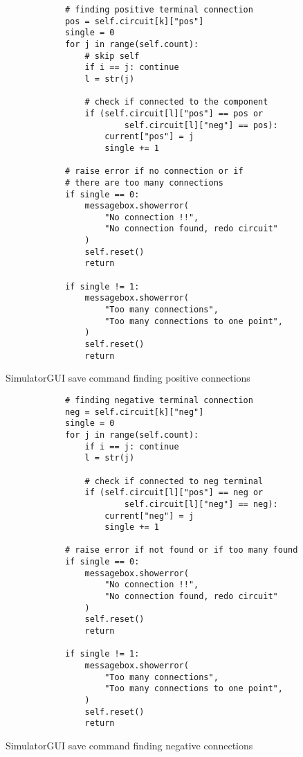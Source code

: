 \newpage
\begin{listing}[!ht]
    \begin{verbatim}
            # finding positive terminal connection
            pos = self.circuit[k]["pos"]
            single = 0
            for j in range(self.count):
                # skip self
                if i == j: continue
                l = str(j)
                
                # check if connected to the component
                if (self.circuit[l]["pos"] == pos or 
                        self.circuit[l]["neg"] == pos):
                    current["pos"] = j
                    single += 1
                
            # raise error if no connection or if 
            # there are too many connections
            if single == 0:
                messagebox.showerror(
                    "No connection !!", 
                    "No connection found, redo circuit"
                )
                self.reset()
                return
            
            if single != 1:
                messagebox.showerror(
                    "Too many connections", 
                    "Too many connections to one point",
                )
                self.reset()
                return
    \end{verbatim}
    \caption{SimulatorGUI save command finding positive connections}
    \label{sc:simgui-save-cmd-2}
\end{listing}

\newpage
\begin{listing}[!ht]
    \begin{verbatim}
            # finding negative terminal connection
            neg = self.circuit[k]["neg"]
            single = 0
            for j in range(self.count):
                if i == j: continue
                l = str(j)
                
                # check if connected to neg terminal
                if (self.circuit[l]["pos"] == neg or 
                        self.circuit[l]["neg"] == neg):
                    current["neg"] = j
                    single += 1
                    
            # raise error if not found or if too many found
            if single == 0:
                messagebox.showerror(
                    "No connection !!", 
                    "No connection found, redo circuit"
                )
                self.reset()
                return
            
            if single != 1:
                messagebox.showerror(
                    "Too many connections", 
                    "Too many connections to one point",
                )
                self.reset()
                return
    \end{verbatim}
    \caption{SimulatorGUI save command finding negative connections}
    \label{sc:simgui-save-cmd-3}
\end{listing}

